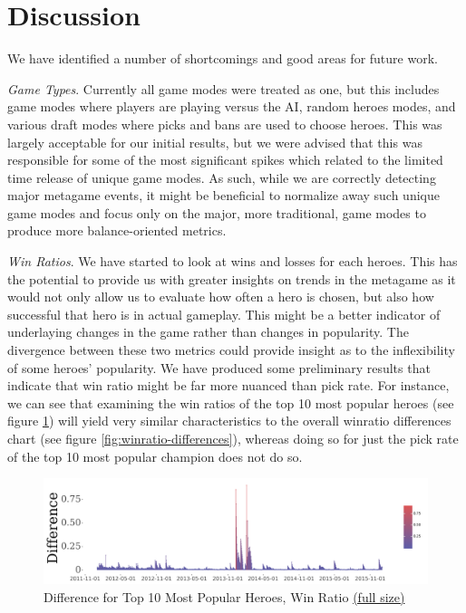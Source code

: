 \section{Discussion}

We have identified a number of shortcomings and good areas for future work.

\emph{Game Types}. Currently all game modes were treated as one, but this includes game modes where players are playing versus the AI, random heroes modes, and various draft modes where picks and bans are used to choose heroes. This was largely acceptable for our initial results, but we were advised that this was responsible for some of the most significant spikes which related to the limited time release of unique game modes. As such, while we are correctly detecting major metagame events, it might be beneficial to normalize away such unique game modes and focus only on the major, more traditional, game modes to produce more balance-oriented metrics.

\emph{Win Ratios}. We have started to look at wins and losses for each heroes. This has the potential to provide us with greater insights on trends in the metagame as it would not only allow us to evaluate how often a hero is chosen, but also how successful that hero is in actual gameplay. This might be a better indicator of underlaying changes in the game rather than changes in popularity. The divergence between these two metrics could provide insight as to the inflexibility of some heroes' popularity. We have produced some preliminary results that indicate that win ratio might be far more nuanced than pick rate. For instance, we can see that examining the win ratios of the top 10 most popular heroes (see figure \ref{fig:winratio-top10-differences}) will yield very similar characteristics to the overall winratio differences chart (see figure \ref{fig:winratio-differences}), whereas doing so for just the pick rate of the top 10 most popular champion does not do so.

\begin{figure}[H]
    \centering
    \caption{Difference for Top 10 Most Popular Heroes, Win Ratio \href{https://raw.githubusercontent.com/marcolussetti/opendotadump-tools/master/prints/winratios_differences/poster_winratio_differences_top_10_15x4_5.png}{(full size)}}
    \label{fig:winratio-top10-differences}
    \includegraphics[width=1\textwidth]{poster_winratio_differences_top_10_15x4_5_small.png}
\end{figure}

